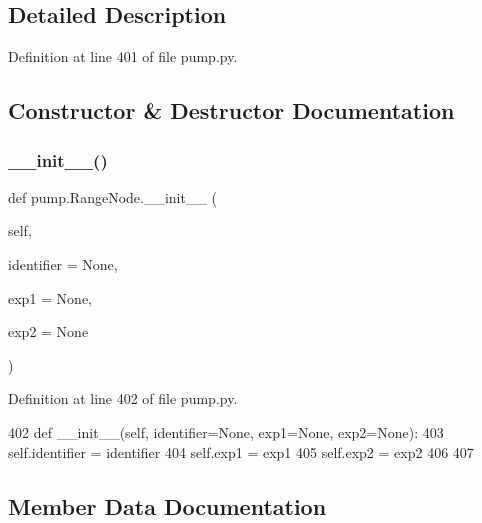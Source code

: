 \subsection{Detailed Description}


Definition at line 401 of file pump.\+py.



\subsection{Constructor \& Destructor Documentation}
\mbox{\label{classpump_1_1RangeNode_a58e85945a5a6e2f899e8243422c871e3}} 
\subsubsection{\texorpdfstring{\+\_\+\+\_\+init\+\_\+\+\_\+()}{\_\_init\_\_()}}
{\footnotesize\ttfamily def pump.\+Range\+Node.\+\_\+\+\_\+init\+\_\+\+\_\+ (\begin{DoxyParamCaption}\item[{}]{self,  }\item[{}]{identifier = {\ttfamily None},  }\item[{}]{exp1 = {\ttfamily None},  }\item[{}]{exp2 = {\ttfamily None} }\end{DoxyParamCaption})}



Definition at line 402 of file pump.\+py.


\begin{DoxyCode}
402   \textcolor{keyword}{def }\_\_init\_\_(self, identifier=None, exp1=None, exp2=None):
403     self.identifier = identifier
404     self.exp1 = exp1
405     self.exp2 = exp2
406 
407 
\end{DoxyCode}


\subsection{Member Data Documentation}
\mbox{\label{classpump_1_1RangeNode_acbb59f8c5e23d23563ca03f21574ce63}} 
